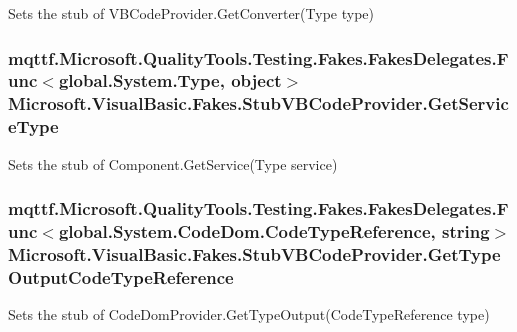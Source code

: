 Sets the stub of V\-B\-Code\-Provider.\-Get\-Converter(\-Type type)

\hypertarget{class_microsoft_1_1_visual_basic_1_1_fakes_1_1_stub_v_b_code_provider_a8e7d7711703851f0563d2f8751f513e4}{
\subsubsection[{Get\-Service\-Type}]{\setlength{\rightskip}{0pt plus 5cm}mqttf.\-Microsoft.\-Quality\-Tools.\-Testing.\-Fakes.\-Fakes\-Delegates.\-Func$<$global.\-System.\-Type, object$>$ Microsoft.\-Visual\-Basic.\-Fakes.\-Stub\-V\-B\-Code\-Provider.\-Get\-Service\-Type}}\label{class_microsoft_1_1_visual_basic_1_1_fakes_1_1_stub_v_b_code_provider_a8e7d7711703851f0563d2f8751f513e4}


Sets the stub of Component.\-Get\-Service(\-Type service)

\hypertarget{class_microsoft_1_1_visual_basic_1_1_fakes_1_1_stub_v_b_code_provider_ac01cc34d50084d26c9090a73d11068ac}{
\subsubsection[{Get\-Type\-Output\-Code\-Type\-Reference}]{\setlength{\rightskip}{0pt plus 5cm}mqttf.\-Microsoft.\-Quality\-Tools.\-Testing.\-Fakes.\-Fakes\-Delegates.\-Func$<$global.\-System.\-Code\-Dom.\-Code\-Type\-Reference, string$>$ Microsoft.\-Visual\-Basic.\-Fakes.\-Stub\-V\-B\-Code\-Provider.\-Get\-Type\-Output\-Code\-Type\-Reference}}\label{class_microsoft_1_1_visual_basic_1_1_fakes_1_1_stub_v_b_code_provider_ac01cc34d50084d26c9090a73d11068ac}


Sets the stub of Code\-Dom\-Provider.\-Get\-Type\-Output(\-Code\-Type\-Reference type)

